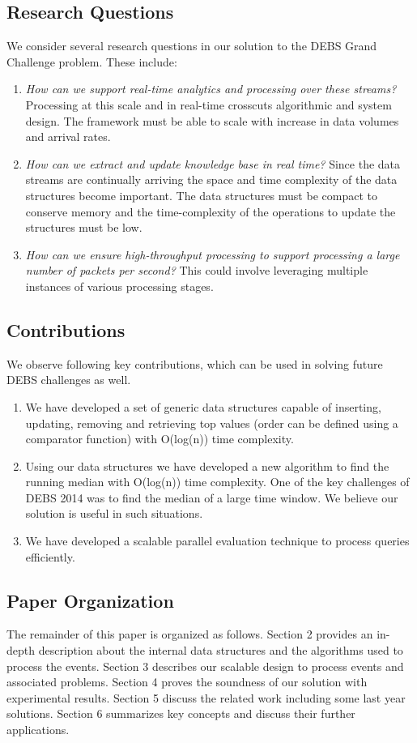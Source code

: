 \subsection{Research Questions}
We consider several research questions in our solution to the DEBS Grand Challenge problem. These include:
\begin{enumerate}
	\item \textit{How can we support real-time analytics and processing over these streams?}  Processing at this scale and in real-time crosscuts algorithmic and system design. The framework must be able to scale with increase in data volumes and arrival rates.
	\item \textit{How can we extract and update knowledge base in real time?}  Since the data streams are continually arriving the space and time complexity of the data structures become important. The data structures must be compact to conserve memory and the time-complexity of the operations to update the structures must be low.
	\item \textit{How can we ensure high-throughput processing to support processing a large number of packets per second?} This could involve leveraging multiple instances of various processing stages. 
\end{enumerate}

\subsection{Contributions}
We observe following key contributions, which can be used in solving future DEBS challenges as well.
\begin{enumerate}
	\item We have developed a set of  generic data structures capable of inserting, updating, removing and retrieving top values (order can be defined using a comparator function) with O(log(n)) time complexity. 
	\item Using our data structures we have developed a new algorithm to find the running median with O(log(n)) time complexity. One of the key challenges of DEBS 2014 \cite{jerzak2014debs}  was to find the median of a large time window. We believe our solution is useful in such situations.
	\item We have developed a scalable parallel evaluation technique to process queries efficiently. 
\end{enumerate}

\subsection{Paper Organization}
The remainder of this paper is organized as follows. Section 2 provides an in-depth description about the internal data structures and the algorithms used to process the events. Section 3 describes our scalable design to process events and associated problems. Section 4 proves the soundness of our solution with experimental results. Section 5 discuss the related work including some last year solutions. Section 6 summarizes key concepts and discuss their further applications. 
